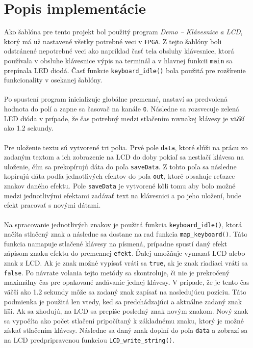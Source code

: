 \documentclass[10pt,a4paper,final]{article}
\begin{document}
\section{Popis implementácie}

\noindent Ako šablóna pre tento projekt bol použitý program \textit{Demo -- Klávesnice a LCD}, ktorý má už nastavené všetky potrebné veci v \texttt{FPGA}. Z tejto šablóny boli odstránené nepotrebné veci ako napríklad časť tela obsluhy klávesnice, ktorá používala v obsluhe klávesnice výpis na terminál a v hlavnej funkcii \texttt{main} sa prepínala LED diodá. Časť funkcie \texttt{keyboard\_idle()} bola použitá pre rozšírenie funkcionality v osekanej šablóny.
\\\\
Po spustení program inicializuje globálne premenné, nastaví sa predvolená hodnota do polí a zapne sa časovač na kanále \texttt{0}\cite{casovac}. Následne sa rozsvecuje zelená LED dióda v prípade, že čas potrebný medzi stlačením rovnakej klávesy je väčší ako 1.2 sekundy.
\\\\
Pre uloženie textu sú vytvorené tri polia. Prvé pole \texttt{data}, ktoré slúži na prácu zo zadaným textom a ich zobrazenie na LCD do doby pokiaľ sa nestlačí klávesa na uloženie, čím sa prekopírujú dáta do poľa \texttt{saveData}. Z tohto poľa sa následne kopírujú dáta podľa jednotlivých efektov do poľa \texttt{out}, ktoré obsahuje reťazec znakov daného efektu. Pole \texttt{saveData} je vytvorené kôli tomu aby bolo možné medzi jednotlivými efektami zadávať text na klávesnici a po jeho uložení, bude efekt pracovať s novými dátami.
\\\\
Na spracovanie jednotlivých znakov je použitá funkcia \texttt{keyboard\_idle()}, ktorá načíta stlačený znak a následne sa dostane na rad funkcia \texttt{map\_keyboard()}. Táto funkcia namapuje stlačené klávesy na písmená, prípadne spustí daný efekt zápisom znaku efektu do premennej \texttt{efekt}. Ďalej umožňuje vymazať LCD alebo znak z LCD. Ak je znak možné vypísať vráti sa \texttt{true}, ak je znak riadiaci vráti sa \texttt{false}. Po návrate volania tejto metódy sa skontroluje, či nie je prekročený maximálny čas pre opakované zadávanie jednej klávesy. V prípade, že je tento čas väčší ako 1.2 sekundy môže sa zadaný znak zapísať na nasledujúcu pozíciu. Táto podmienka je použitá len vtedy, keď sa predchádzajúci a aktuálne zadaný znak líši. Ak sa zhodujú, na LCD sa prepíše posledný znak novým znakom. Nový znak sa vypočíta ako počet stlačení pripočítaný k základnému znaku, ktorý je možné získať stlačením klávesy. Následne sa daný znak doplní do poľa \texttt{data} a zobrazí sa na LCD predpripravenou funkciou \texttt{LCD\_write\_string()}.
\end{document}
